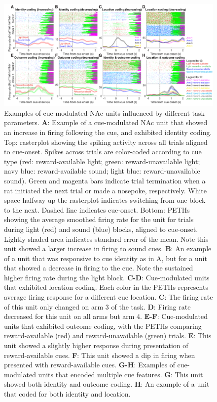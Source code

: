 \documentclass[11pt]{article}
\newcommand{\bsf}[1]{\textbf{#1}}
\begin{document}
 \begin{figure}[ht!]
\centering
\includegraphics[width=\textwidth]{Fig 3 - Neural examples.pdf}
\caption{Examples of cue-modulated NAc units influenced by different task parameters. \bsf{A}: Example of a cue-modulated NAc unit that showed an increase in firing following the cue, and exhibited identity coding. Top: rasterplot showing the spiking activity across all trials aligned to cue-onset. Spikes across trials are color-coded according to cue type (red: reward-available light; green: reward-unavailable light; navy blue: reward-available sound; light blue: reward-unavailable sound). Green and magenta bars indicate trial termination when a rat initiated the next trial or made a nosepoke, respectively. White space halfway up the rasterplot indicates switching from one block to the next. Dashed line indicates cue-onset. Bottom: PETHs showing the average smoothed firing rate for the unit for trials during light (red) and sound (blue) blocks, aligned to cue-onset. Lightly shaded area indicates standard error of the mean. Note this unit showed a larger increase in firing to sound cues. \bsf{B}: An example of a unit that was responsive to cue identity as in A, but for a unit that showed a decrease in firing to the cue. Note the sustained higher firing rate during the light block. \bsf{C-D}: Cue-modulated units that exhibited location coding. Each color in the PETHs represents average firing response for a different cue location. \bsf{C}: The firing rate of this unit only changed on arm 3 of the task. \bsf{D}: Firing rate decreased for this unit on all arms but arm 4. \bsf{E-F}: Cue-modulated units that exhibited outcome coding, with the PETHs comparing reward-available (red) and reward-unavailable (green) trials. \bsf{E}: This unit showed a slightly higher response during presentation of reward-available cues. \bsf{F}: This unit showed a dip in firing when presented with reward-available cues. \bsf{G-H}: Examples of cue-modulated units that encoded multiple cue features. \bsf{G}: This unit showed both identity and outcome coding. \bsf{H}: An example of a unit that coded for both identity and location.}
\label{fig:examples}
\end{figure} \clearpage
\end{document}

